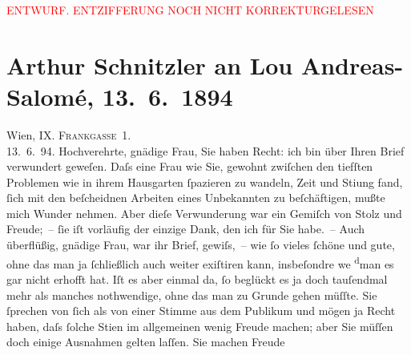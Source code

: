 
\begin{center}
            \textcolor{red}{ENTWURF. ENTZIFFERUNG NOCH NICHT KORREKTURGELESEN}
                      \end{center}
            
               \section[Arthur Schnitzler an Lou Andreas-Salomé, 13. 6. 1894]{ Arthur Schnitzler an Lou Andreas-Salomé, 13. 6. 1894}\nopagebreak{}\rehead{ }\begin{ledgroupsized}[t]{13cm}\normalsize\beginnumbering{} \toendnotes[C]{\smallbreak\pagebreak[2]} 
\toendnotes[C]{\smallbreak}\pstart
           \raggedleft{}{\pb}Wien, IX. \textsc{Frankgasse 1}.{\\}13. 6. 94.\pend
           \pstart{}Hochverehrte, gnädige Frau,\pend\pstart
           Sie haben Recht: ich bin über Ihren Brief verwundert geweſen. Daſs eine Frau wie Sie,
               gewohnt zwiſchen den tiefſten Problemen wie in ihrem Hausgarten ſpazieren zu wandeln,
               Zeit und Sti{\geminationm}ung fand, ſich mit den beſcheidnen Arbeiten
               eines Unbekannten zu beſchäftigen, mußte mich Wunder nehmen. Aber dieſe Verwunderung
                  {\pb}war ein Gemiſch von Stolz und Freude; – ſie iſt vorläufig der einzige
               Dank, den ich für Sie habe. – Auch überflüßig, gnädige Frau, war ihr Brief, gewiſs, –
               wie ſo vieles ſchöne und gute, ohne das man ja ſchließlich auch weiter exiſtiren
               kann, insbeſondre we{\geminationn}{ }\substVorne{}\textsuperscript{d}\substDazwischen{}m\substHinten{}an es gar nicht erhofft hat. Iſt es aber einmal da, ſo beglückt es ja doch
               tauſendmal mehr als manches noth{\pb}wendige, ohne das man zu Grunde gehen
               müſſte. Sie ſprechen von ſich als von einer Stimme aus dem Publikum und mögen ja
               Recht haben, daſs ſolche Sti{\geminationm}en im allgemeinen wenig
               Freude machen; aber Sie müſſen doch einige Ausnahmen gelten laſſen. Sie machen Freude

\end{ledgroupsized}
